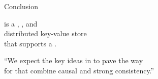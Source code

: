 
\begin{frame}{Conclusion}
  \begin{center}
    \unistore{} is a , , and  \\[8pt]
     distributed key-value store \\[8pt]
    that supports a .

    \pause
    \vspace{0.80cm}
    ``We expect the key ideas in \unistore{} to pave the way \\[3pt]
    for  that combine causal and strong consistency.''
  \end{center}
\end{frame}
